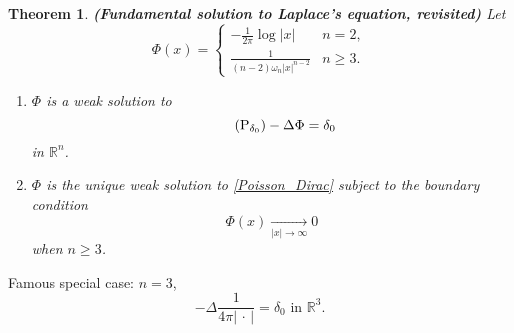 \documentclass[12pt]{article}
\newtheorem{theorem}{Theorem}[section]
\theoremstyle{definition}
\begin{document}
\begin{theorem}\label{Laplace_sol_review}
\emph{\textbf{(Fundamental solution to Laplace's equation, revisited)}} Let
\[\Phi(x)=\left\{\begin{array}{ll}\displaystyle{-\frac{1}{2\pi}\log|x|}&n=2,\\\displaystyle{\frac{1}{(n-2)\omega_n|x|^{n-2}}}&n\geq3.\end{array}\right.\]

\begin{enumerate}[label=\alph*)]
\item $\Phi$ is a weak solution to
\begin{equation}\tag{P$_{\delta_0}$}\label{Poisson_Dirac}
-\Delta\Phi=\delta_0
\end{equation}
in $\mathbb{R}^n$.

\item $\Phi$ is the unique weak solution to \eqref{Poisson_Dirac} subject to the boundary condition
\[\Phi(x)\xrightarrow[|x|\to\infty]{}0\]
when $n\geq3$.
\end{enumerate}
\end{theorem}

Famous special case: $n=3$,
\[-\Delta\frac{1}{4\pi|\,\cdot\,|}=\delta_0\text{ in }\mathbb{R}^3.\]
\end{document}
